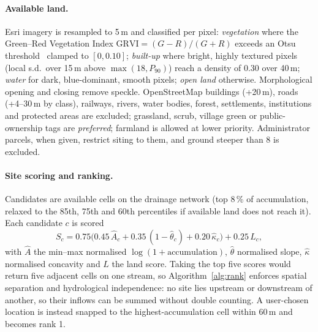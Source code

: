 \documentclass[manuscript,screen,review]{acmart}
\begin{document}
\paragraph{Available land.} Esri imagery is resampled to 5\,m and classified per pixel:
\emph{vegetation} where the Green--Red Vegetation Index $\mathrm{GRVI}=(G-R)/(G+R)$ exceeds an
Otsu threshold~\cite{otsu1979} clamped to $[0,0.10]$; \emph{built-up} where bright, highly
textured pixels (local s.d.\ over 15\,m above $\max(18, P_{90})$) reach a density of 0.30 over
40\,m; \emph{water} for dark, blue-dominant, smooth pixels; \emph{open land} otherwise.
Morphological opening and closing remove speckle. OpenStreetMap buildings (+20\,m), roads
(+4--30\,m by class), railways, rivers, water bodies, forest, settlements, institutions and
protected areas are excluded; grassland, scrub, village green or public-ownership tags are
\emph{preferred}; farmland is allowed at lower priority. Administrator parcels, when given,
restrict siting to them, and ground steeper than 8\textdegree{} is excluded.

\paragraph{Site scoring and ranking.} Candidates are available cells on the drainage network
(top 8\,\% of accumulation, relaxed to the 85th, 75th and 60th percentiles if available land
does not reach it). Each candidate $c$ is scored
\begin{equation}
S_c = 0.75\big(0.45\,\hat A_c + 0.35\,(1-\hat\theta_c) + 0.20\,\hat\kappa_c\big) + 0.25\,L_c,
\end{equation}
with $\hat A$ the min--max normalised $\log(1+\text{accumulation})$, $\hat\theta$ normalised
slope, $\hat\kappa$ normalised concavity and $L$ the land score. Taking the top five scores
would return five adjacent cells on one stream, so Algorithm~\ref{alg:rank} enforces spatial
separation and hydrological independence: no site lies upstream or downstream of another, so
their inflows can be summed without double counting. A user-chosen location is instead
snapped to the highest-accumulation cell within 60\,m and becomes rank 1.
\end{document}

